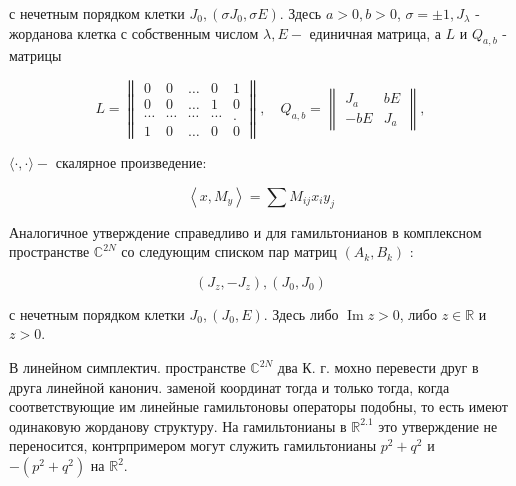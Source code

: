 \documentclass[10pt]{article}
\begin{document}
с нечетным порядком клетки $J_{0},\left(\sigma J_{0}, \sigma E\right)$. Здесь $a>0, b>0$, $\sigma= \pm 1, J_{\lambda}$ - жорданова клетка с собственным числом $\lambda, E-$ единичная матрица, а $L$ и $Q_{a, b}$ - матрицы



\[

L=\left\|\begin{array}{ccccc}

0 & 0 & \ldots & 0 & 1 \\

0 & 0 & \ldots & 1 & 0 \\

\cdots & \cdots & \cdots & \cdots & . \\

1 & 0 & \ldots & 0 & 0

\end{array}\right\|, \quad Q_{a, b}=\left\|\begin{array}{cc}

J_{a} & b E \\

-b E & J_{a}

\end{array}\right\|,

\]



$\langle\cdot, \cdot\rangle-$ скалярное произведение:



\[

\left\langle x, M_{y}\right\rangle=\sum M_{i j} x_{i} y_{j}

\]



Аналогичное утверждение справедливо и для гамильтонианов в комплексном пространстве $\mathbb{C}^{2 N}$ со следующим списком пар матриц $\left(A_{k}, B_{k}\right)$ :



\[

\left(J_{z},-J_{z}\right),\left(J_{0}, J_{0}\right)

\]



с нечетным порядком клетки $J_{0},\left(J_{0}, E\right)$. Здесь либо $\operatorname{Im} z>0$, либо $z \in \mathbb{R}$ и $z>0$.



В линейном симплектич. пространстве $\mathbb{C}^{2 N}$ два К. г. мохно перевести друг в друга линейной канонич. заменой координат тогда и только тогда, когда соответствующие им линейные гамильтоновы операторы подобны, то есть имеют одинаковую жорданову структуру. На гамильтонианы в $\mathbb{R}^{2.1}$ это утверждение не переносится, контрпримером могут служить гамильтонианы $p^{2}+q^{2}$ и $-\left(p^{2}+q^{2}\right)$ на $\mathbb{R}^{2}$.
\end{document}
